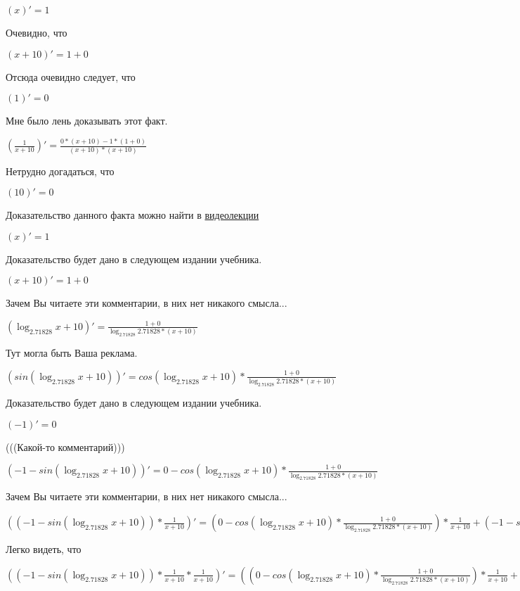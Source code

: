 \documentclass[12pt,a4paper,fleqn]{article}
\theoremstyle{definition}
\begin{document}
$( x )' =  1 $

Очевидно, что

$( x  +  10 )' =  1  +  0 $

Отсюда очевидно следует, что

$( 1 )' =  0 $

Мне было лень доказывать этот факт.

$(\frac{ 1 }{ x  +  10 }
)' = \frac{ 0  * ( x  +  10 ) -  1  * ( 1  +  0 )}{( x  +  10 ) * ( x  +  10 )}
$

Нетрудно догадаться, что

$( 10 )' =  0 $

Доказательство данного факта можно найти в \href{https://www.youtube.com/watch?v=dQw4w9WgXcQ}{видеолекции}

$( x )' =  1 $

Доказательство будет дано в следующем издании учебника.

$( x  +  10 )' =  1  +  0 $

Зачем Вы читаете эти комментарии, в них нет никакого смысла...

$(\log_{ 2.71828 }{ x  +  10 })' = \frac{ 1  +  0 }{\log_{ 2.71828 }{ 2.71828 } * ( x  +  10 )}
$

Тут могла быть Ваша реклама.

$(sin(\log_{ 2.71828 }{ x  +  10 }))' = cos(\log_{ 2.71828 }{ x  +  10 }) * \frac{ 1  +  0 }{\log_{ 2.71828 }{ 2.71828 } * ( x  +  10 )}
$

Доказательство будет дано в следующем издании учебника.

$( -1 )' =  0 $

(((Какой-то комментарий)))

$( -1  - sin(\log_{ 2.71828 }{ x  +  10 }))' =  0  - cos(\log_{ 2.71828 }{ x  +  10 }) * \frac{ 1  +  0 }{\log_{ 2.71828 }{ 2.71828 } * ( x  +  10 )}
$

Зачем Вы читаете эти комментарии, в них нет никакого смысла...

$(( -1  - sin(\log_{ 2.71828 }{ x  +  10 })) * \frac{ 1 }{ x  +  10 }
)' = ( 0  - cos(\log_{ 2.71828 }{ x  +  10 }) * \frac{ 1  +  0 }{\log_{ 2.71828 }{ 2.71828 } * ( x  +  10 )}
) * \frac{ 1 }{ x  +  10 }
 + ( -1  - sin(\log_{ 2.71828 }{ x  +  10 })) * \frac{ 0  * ( x  +  10 ) -  1  * ( 1  +  0 )}{( x  +  10 ) * ( x  +  10 )}
$

Легко видеть, что

$(( -1  - sin(\log_{ 2.71828 }{ x  +  10 })) * \frac{ 1 }{ x  +  10 }
 * \frac{ 1 }{ x  +  10 }
)' = (( 0  - cos(\log_{ 2.71828 }{ x  +  10 }) * \frac{ 1  +  0 }{\log_{ 2.71828 }{ 2.71828 } * ( x  +  10 )}
) * \frac{ 1 }{ x  +  10 }
 + ( -1  - sin(\log_{ 2.71828 }{ x  +  10 })) * \frac{ 0  * ( x  +  10 ) -  1  * ( 1  +  0 )}{( x  +  10 ) * ( x  +  10 )}
) * \frac{ 1 }{ x  +  10 }
 + ( -1  - sin(\log_{ 2.71828 }{ x  +  10 })) * \frac{ 1 }{ x  +  10 }
 * \frac{ 0  * ( x  +  10 ) -  1  * ( 1  +  0 )}{( x  +  10 ) * ( x  +  10 )}
$
\end{document}
